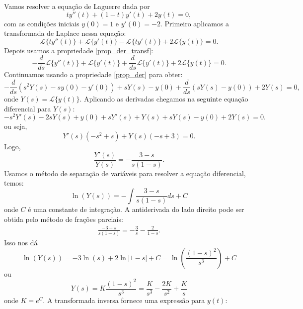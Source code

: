 \begin{ex}Vamos resolver a equação de Laguerre dada por
\begin{equation}
ty''(t)+(1-t)y'(t)+2y(t)=0,
\end{equation}
com as condições iniciais $y(0)=1$ e $y'(0)=-2$. Primeiro aplicamos a transformada de Laplace nessa equação:
\begin{equation}
\mathcal{L}\{ty''(t)\}+\mathcal{L}\{y'(t)\}-\mathcal{L}\{ty'(t)\}+2\mathcal{L}\{y(t)\}=0.
\end{equation}
Depois usamos a propriedade \ref{prop_der_transf}:
\begin{equation}
-\frac{d}{ds}\mathcal{L}\{y''(t)\}+\mathcal{L}\{y'(t)\}+\frac{d}{ds}\mathcal{L}\{y'(t)\}+2\mathcal{L}\{y(t)\}=0.
\end{equation}
Continuamos usando a propriedade \ref{prop_der} para obter:
\begin{equation}
-\frac{d}{ds}\left(s^2Y(s)-sy(0)-y'(0)\right)+sY(s)-y(0)+\frac{d}{ds}\left(sY(s)-y(0)\right)+2Y(s)=0,
\end{equation}
onde $Y(s)=\mathcal{L}\{y(t)\}$. Aplicando as derivadas chegamos na seguinte equação diferencial para $Y(s)$:
\begin{equation}
-s^2Y'(s)-2sY(s)+y(0)+sY'(s)+Y(s)+sY(s)-y(0)+2Y(s)=0.
\end{equation}
ou seja,
\begin{equation}
Y'(s)\left(-s^2+s\right)+Y(s)\left(-s+3\right)=0.
\end{equation}
Logo,
\begin{equation}
\frac{Y'(s)}{Y(s)}=-\frac{3-s}{s(1-s)}.
\end{equation}
Usamos o método de separação de variáveis para resolver a equação diferencial, temos:
\begin{equation}
\ln(Y(s))=-\int \frac{3-s}{s(1-s)} ds +C
\end{equation}
onde $C$ é uma constante de integração. A antiderivada do lado direito pode ser obtida pelo método de frações parciais:
\begin{eqnarray*}
\frac{-3+s}{s(1-s)}=-\frac{3}{s}-\frac{2}{1-s}.
\end{eqnarray*}
Isso nos dá
\begin{equation}
\ln(Y(s))=-3\ln(s)+2\ln|1-s|+C=\ln\left(\frac{(1-s)^2}{s^3} \right)+C
\end{equation}
ou
\begin{equation}
Y(s)=K\frac{(1-s)^2}{s^3}=\frac{K}{s^3}-\frac{2K}{s^2}+\frac{K}{s}
\end{equation}
onde $K=e^C$. A transformada inversa fornece uma expressão para $y(t)$:

\end{ex}
